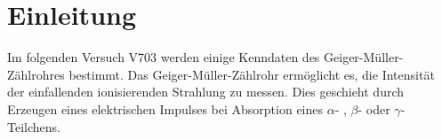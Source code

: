 \section{Einleitung}
Im folgenden Versuch V703 werden einige Kenndaten des Geiger-Müller-Zählrohres bestimmt.
Das Geiger-Müller-Zählrohr ermöglicht es, die Intensität der einfallenden ionisierenden Strahlung zu
messen. Dies geschieht durch Erzeugen eines elektrischen Impulses bei Absorption eines $\alpha$- ,
$\beta$- oder $\gamma$-Teilchens.


\label{sec:Einleitung}
